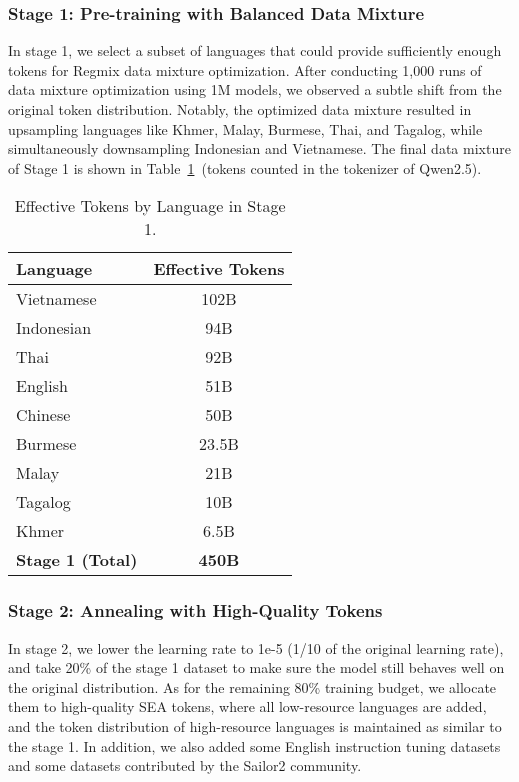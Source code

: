 \subsubsection{Stage 1: Pre-training with Balanced Data Mixture}
In stage 1, we select a subset of languages that could provide sufficiently enough tokens for Regmix data mixture optimization. 
After conducting 1,000 runs of data mixture optimization using 1M models, we observed a subtle shift from the original token distribution. Notably, the optimized data mixture resulted in upsampling languages like Khmer, Malay, Burmese, Thai, and Tagalog, while simultaneously downsampling Indonesian and Vietnamese. The final data mixture of Stage 1 is shown in Table~\ref{tab:effective_tokens_stage1}~(tokens counted in the tokenizer of Qwen2.5).

\vspace{-1mm}
\begin{table}[ht]
\centering
\caption{Effective Tokens by Language in Stage 1.}
\begin{tabular}{lc}
\toprule
\textbf{Language} & \textbf{Effective Tokens} \\ \midrule
Vietnamese & 102B \\
Indonesian & 94B \\
Thai       & 92B \\
English    & 51B \\
Chinese    & 50B \\
Burmese    & 23.5B \\
Malay      & 21B \\
Tagalog    & 10B \\
Khmer      & 6.5B \\ \midrule
\textbf{Stage 1 (Total)} & \textbf{450B} \\ \bottomrule
\end{tabular}
\label{tab:effective_tokens_stage1}
\end{table}
\vspace{-1mm}


\subsubsection{Stage 2: Annealing with High-Quality Tokens}
In stage 2, we lower the learning rate to 1e-5 (1/10 of the original learning rate), and take 20\% of the stage 1 dataset to make sure the model still behaves well on the original distribution. As for the remaining 80\% training budget, we allocate them to high-quality SEA tokens, where all low-resource languages are added, and the token distribution of high-resource languages is maintained as similar to the stage 1.
In addition, we also added some English instruction tuning datasets and some datasets contributed by the Sailor2 community.

